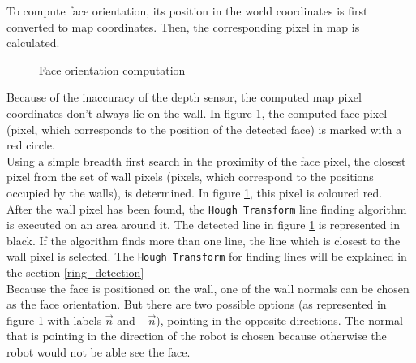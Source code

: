 \documentclass[12pt,a4paper]{article}
\begin{document}
	To compute face orientation, its position in the world coordinates is first converted to map coordinates. Then, the corresponding pixel in map is calculated. \\
	
	\begin{figure}[h]
		\centering
		\caption{Face orientation computation}
		\label{fig:orientation_computation}
	\end{figure}
	
	Because of the inaccuracy of the depth sensor, the computed map pixel coordinates don't always lie on the wall. In figure \ref{fig:orientation_computation}, the computed face pixel (pixel, which corresponds to the position of the detected face) is marked with a red circle. \\ 
	
	Using a simple breadth first search in the proximity of the face pixel, the closest pixel from the set of wall pixels (pixels, which correspond to the positions occupied by the walls), is determined. In figure \ref{fig:orientation_computation}, this pixel is coloured red. \\
	
	After the wall pixel has been found, the \texttt{Hough Transform} line finding algorithm is executed on an area around it. The detected line in figure \ref{fig:orientation_computation} is represented in black. If the algorithm finds more than one line, the line which is closest to the wall pixel is selected. The \texttt{Hough Transform} for finding lines will be explained in the section \ref{ring_detection}\\
	
	Because the face is positioned on the wall, one of the wall normals can be chosen as the face orientation. But there are two possible options (as represented in figure \ref{fig:orientation_computation} with labels $\vec{n}$ and $-\vec{n}$), pointing in the opposite directions. The normal that is pointing in the direction of the robot is chosen because otherwise the robot would not be able see the face. \\ 
		
\end{document}
